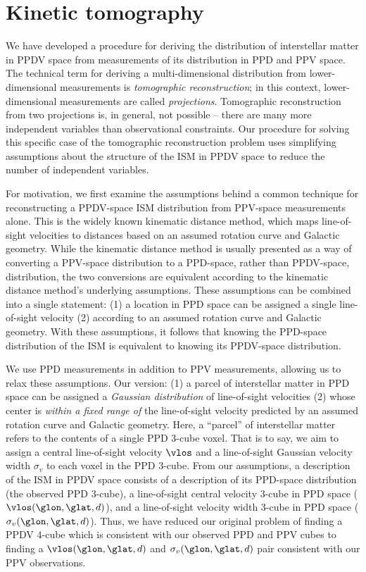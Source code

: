 \section{Kinetic tomography}
\label{sec:KT}
We have developed a procedure for deriving the distribution of interstellar matter in PPDV space from measurements of its distribution in PPD and PPV space. 
The technical term for deriving a multi-dimensional distribution from lower-dimensional measurements is \emph{tomographic reconstruction}; in this context, lower-dimensional measurements are called \emph{projections}. 
Tomographic reconstruction from two projections is, in general, not possible -- there are many more independent variables than observational constraints. 
Our procedure for solving this specific case of the tomographic reconstruction problem uses simplifying assumptions about the structure of the ISM in PPDV space to reduce the number of independent variables.

For motivation, we first examine the assumptions behind a common technique for reconstructing a PPDV-space ISM distribution from PPV-space measurements alone. 
This is the widely known kinematic distance method, which maps line-of-sight velocities to distances based on an assumed rotation curve and Galactic geometry. 
While the kinematic distance method is usually presented as a way of converting a PPV-space distribution to a PPD-space, rather than PPDV-space, distribution, the two conversions are equivalent according to the kinematic distance method's underlying assumptions.
These assumptions can be combined into a single statement: (1) a location in PPD space can be assigned a single line-of-sight velocity (2) according to an assumed rotation curve and Galactic geometry. 
With these assumptions, it follows that knowing the PPD-space distribution of the ISM is equivalent to knowing its PPDV-space distribution. 

We use PPD measurements in addition to PPV measurements, allowing us to relax these assumptions. 
Our version: (1) a parcel of interstellar matter in PPD space can be assigned a \emph{Gaussian distribution} of line-of-sight velocities (2) whose center is \emph{within a fixed range of} the line-of-sight velocity predicted by an assumed rotation curve and Galactic geometry. 
Here, a ``parcel'' of interstellar matter refers to the contents of a single PPD 3-cube voxel. 
That is to say, we aim to assign a central line-of-sight velocity $\vlos$ and a line-of-sight Gaussian velocity width $\sigma_v$ to each voxel in the PPD 3-cube. 
From our assumptions, a description of the ISM in PPDV space consists of a description of its PPD-space distribution (the observed PPD 3-cube), a line-of-sight central velocity 3-cube in PPD space ($\vlos(\glon, \glat, d)$), and a line-of-sight velocity width 3-cube in PPD space ($\sigma_v (\glon, \glat, d)$). 
Thus, we have reduced our original problem of finding a PPDV 4-cube which is consistent with our observed PPD and PPV cubes to finding a $\vlos(\glon, \glat, d)$ and $\sigma_v(\glon, \glat, d)$ pair consistent with our PPV observations.


